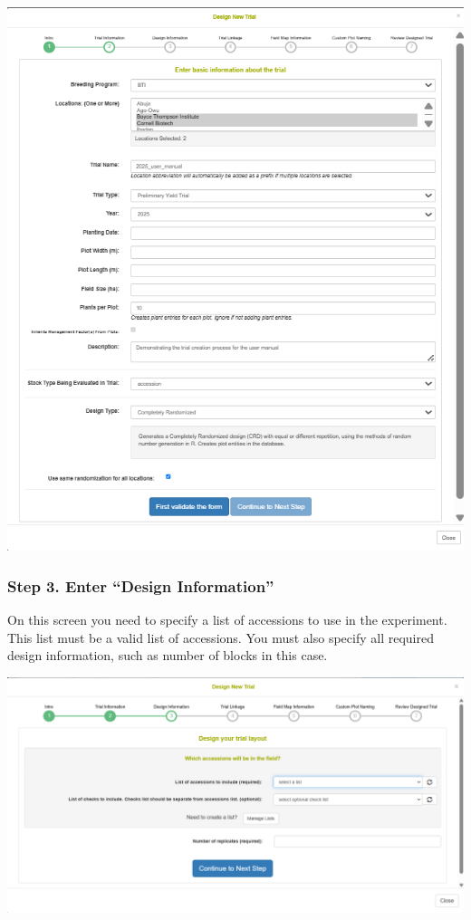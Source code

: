 \documentclass[
  12pt,
]{book}
\begin{document}
\begin{center}\includegraphics[width=0.95\linewidth]{assets/images/trial_create_form_2} \end{center}

\hypertarget{step-3.-enter-design-information}{%
\subsubsection*{Step 3. Enter ``Design Information''}\label{step-3.-enter-design-information}}


On this screen you need to specify a list of accessions to use in the experiment. This list must be a valid list of accessions. You must also specify all required design information, such as number of blocks in this case.

\begin{center}\includegraphics[width=0.95\linewidth]{assets/images/trial_create_form_3} \end{center}
\end{document}
